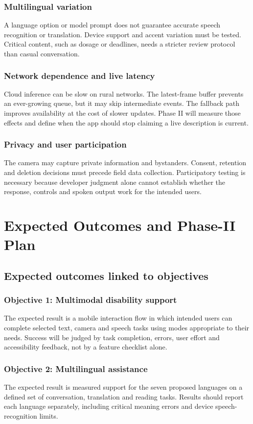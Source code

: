 \documentclass[12pt,a4paper,oneside]{report}
\begin{document}
\subsection{Multilingual variation}
A language option or model prompt does not guarantee accurate speech recognition or translation. Device support and accent variation must be tested. Critical content, such as dosage or deadlines, needs a stricter review protocol than casual conversation.

\subsection{Network dependence and live latency}
Cloud inference can be slow on rural networks. The latest-frame buffer prevents an ever-growing queue, but it may skip intermediate events. The fallback path improves availability at the cost of slower updates. Phase II will measure those effects and define when the app should stop claiming a live description is current.

\subsection{Privacy and user participation}
The camera may capture private information and bystanders. Consent, retention and deletion decisions must precede field data collection. Participatory testing is necessary because developer judgment alone cannot establish whether the response, controls and spoken output work for the intended users.

\chapter{Expected Outcomes and Phase-II Plan}
\section{Expected outcomes linked to objectives}
\subsection{Objective 1: Multimodal disability support}
The expected result is a mobile interaction flow in which intended users can complete selected text, camera and speech tasks using modes appropriate to their needs. Success will be judged by task completion, errors, user effort and accessibility feedback, not by a feature checklist alone.

\subsection{Objective 2: Multilingual assistance}
The expected result is measured support for the seven proposed languages on a defined set of conversation, translation and reading tasks. Results should report each language separately, including critical meaning errors and device speech-recognition limits.
\end{document}
